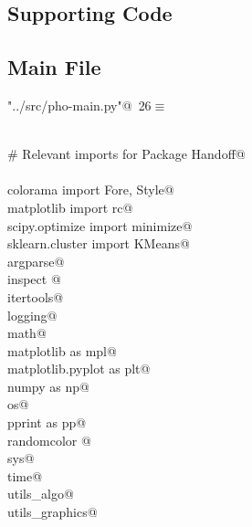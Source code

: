 \documentclass[10.0pt]{report}
\begin{document}
\begin{appendices}
\chapter{Supporting Code}

\section{Main File}



\begin{flushleft} \small\label{scrap12}\raggedright\small
{} \verb@"../src/pho-main.py"@\nobreak\ {\footnotesize {26}}$\equiv$
\vspace{-1ex}
\begin{list}{}{} \item
\mbox{}\verb@@\\
\mbox{}\verb@# Relevant imports for Package Handoff@\\
\mbox{}\verb@@\\
\mbox{}\verb@from colorama import Fore, Style@\\
\mbox{}\verb@from matplotlib import rc@\\
\mbox{}\verb@from scipy.optimize import minimize@\\
\mbox{}\verb@from sklearn.cluster import KMeans@\\
\mbox{}\verb@import argparse@\\
\mbox{}\verb@import inspect @\\
\mbox{}\verb@import itertools@\\
\mbox{}\verb@import logging@\\
\mbox{}\verb@import math@\\
\mbox{}\verb@import matplotlib as mpl@\\
\mbox{}\verb@import matplotlib.pyplot as plt@\\
\mbox{}\verb@import numpy as np@\\
\mbox{}\verb@import os@\\
\mbox{}\verb@import pprint as pp@\\
\mbox{}\verb@import randomcolor @\\
\mbox{}\verb@import sys@\\
\mbox{}\verb@import time@\\
\mbox{}\verb@import utils_algo@\\
\mbox{}\verb@import utils_graphics@\\
\mbox{}\verb@@\\

\end{list}
\end{flushleft}
\end{appendices}
\end{document}
